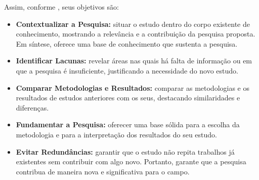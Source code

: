 Assim, conforme , seus objetivos são:
\begin{itemize}[nosep, leftmargin=2.5cm]
    \item \textbf{Contextualizar a Pesquisa:} situar o estudo dentro do corpo existente de conhecimento, mostrando a relevância e a contribuição da pesquisa proposta. Em síntese, oferece uma base de conhecimento que sustenta a pesquisa.
    \item \textbf{Identificar Lacunas:} revelar áreas nas quais há falta de informação ou em que a pesquisa é insuficiente, justificando a necessidade do novo estudo.
    \item \textbf{Comparar Metodologias e Resultados:} comparar as metodologias e os resultados de estudos anteriores com os seus, destacando similaridades e diferenças.
    \item \textbf{Fundamentar a Pesquisa:} oferecer uma base sólida para a escolha da metodologia e para a interpretação dos resultados do seu estudo.
    \item \textbf{Evitar Redundâncias:} garantir que o estudo não repita trabalhos já existentes sem contribuir com algo novo. Portanto, garante que a pesquisa contribua de maneira nova e significativa para o campo.
\end{itemize}

